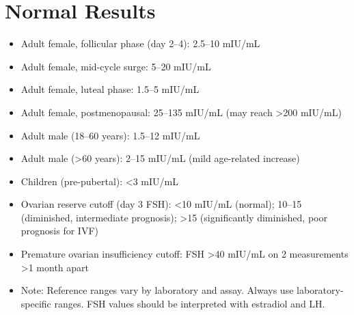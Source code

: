 \section*{Normal Results}
\begin{itemize}
  \item Adult female, follicular phase (day 2--4): 2.5--10 mIU/mL
  \item Adult female, mid-cycle surge: 5--20 mIU/mL
  \item Adult female, luteal phase: 1.5--5 mIU/mL
  \item Adult female, postmenopausal: 25--135 mIU/mL (may reach >200 mIU/mL)
  \item Adult male (18--60 years): 1.5--12 mIU/mL
  \item Adult male (>60 years): 2--15 mIU/mL (mild age-related increase)
  \item Children (pre-pubertal): <3 mIU/mL
  \item Ovarian reserve cutoff (day 3 FSH): <10 mIU/mL (normal); 10--15 (diminished, intermediate prognosis); >15 (significantly diminished, poor prognosis for IVF)
  \item Premature ovarian insufficiency cutoff: FSH >40 mIU/mL on 2 measurements >1 month apart
  \item Note: Reference ranges vary by laboratory and assay. Always use laboratory-specific ranges. FSH values should be interpreted with estradiol and LH.
\end{itemize}

